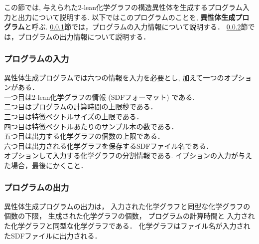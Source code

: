\documentclass[11pt,titlepage,dvipdfmx,twoside]{jsbook}
\begin{document}
この節では, 与えられた2-lean化学グラフの構造異性体を生成するプログラム入力と出力について説明する.
以下ではこのプログラムのことを, {\bf 異性体生成プログラム}と呼ぶ.
\ref{chap:Input_m}節では，プログラムの入力情報について説明する．
\ref{chap:Output_m}節では，プログラムの出力情報について説明する．

\subsubsection{プログラムの入力}
\label{chap:Input_m}



異性体生成プログラムでは六つの情報を入力を必要とし, 加えて一つのオプションがある．\\
一つ目は2-lean化学グラフの情報 (SDFフォーマット) である.\\
二つ目はプログラムの計算時間の上限秒である．\\
三つ目は特徴ベクトルサイズの上限である．\\
四つ目は特徴ベクトルあたりのサンプル木の数である．\\
五つ目は出力する化学グラフの個数の上限である．\\
六つ目は出力される化学グラフを保存するSDFファイル名である．\\
オプションして入力する化学グラフの分割情報である.
イプションの入力が与えた場合，最後にかくこと．

\bigskip





\subsubsection{プログラムの出力}
\label{chap:Output_m}

異性体生成プログラムの出力は，
入力された化学グラフと同型な化学グラフの個数の下限，
生成された化学グラフの個数，
プログラムの計算時間と
入力された化学グラフと同型な化学グラフである．
化学グラフはファイル名が入力されたSDFファイルに出力される．
\end{document}
